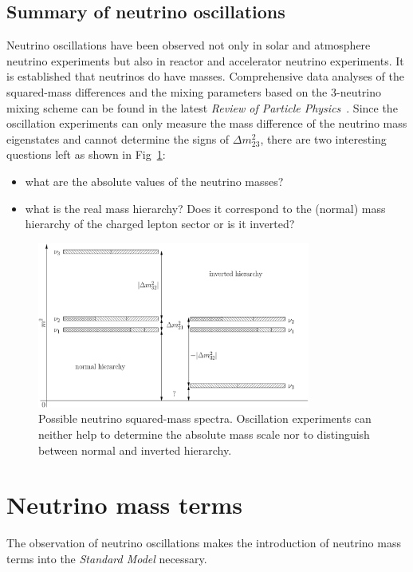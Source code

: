\subsection{Summary of neutrino oscillations}
\label{sec:allo}
Neutrino oscillations have been observed not only in solar and atmosphere neutrino experiments but also in reactor and accelerator neutrino experiments. It is established that neutrinos do have masses. Comprehensive data analyses of the squared-mass differences and the mixing parameters based on the 3-neutrino mixing scheme can be found in the latest \emph{Review of Particle Physics}~\cite{PDG08}. Since the oscillation experiments can only measure the mass difference of the neutrino mass eigenstates and cannot determine the signs of $\Delta m^{2}_{23}$, there are two interesting questions left as shown in Fig~\ref{fig:hie}:
\begin{itemize}
\item what are the absolute values of the neutrino masses?
\item what is the real mass hierarchy? Does it correspond to the   (normal) mass hierarchy of the charged lepton sector or is it   inverted?
\end{itemize}
\begin{figure}[tbhp]
  \centering
  \includegraphics[width=0.8\textwidth]{massHierarchy.eps}  
  \caption{Possible neutrino squared-mass spectra. Oscillation     experiments can neither help to determine the absolute mass scale     nor to distinguish between normal and inverted hierarchy.}
  \label{fig:hie}
\end{figure}


\section{Neutrino mass terms}
\label{sec:nema}
The observation of neutrino oscillations makes the introduction of
neutrino mass terms into the \emph{Standard Model} necessary.
